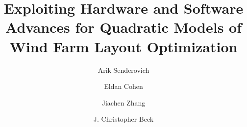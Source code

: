 \documentclass[preprint,12pt]{elsarticle}
\newcommand{\mytitle}{Exploiting Hardware and Software Advances 
 for Quadratic Models of Wind Farm Layout Optimization}
\begin{document}
	

\title{\mytitle}


\author[add1]{Arik Senderovich}


\author[add2]{Eldan Cohen}







\author[add2]{Jiachen Zhang}

\author[add2]{J. Christopher Beck}


\address[add1]{Faculty of Information, University of Toronto, 140 St. George St., Toronto, Canada}
\address[add2]{Department of Mechanical and Industrial Engineering, University of Toronto, 40 St. George St., Toronto, Canada}
\end{document}
